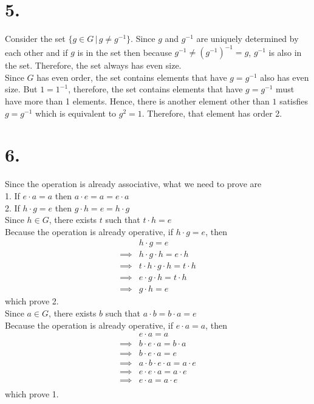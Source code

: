 \documentclass[11pt]{article}
\begin{document}
\pagebreak
\section*{5.}
Consider the set $\{g \in G \, | \, g \ne g^{-1}\}$. Since $g$ and $g^{-1}$ are uniquely determined by each other and if $g$ is in the set then because $g^{-1} \ne (g^{-1})^{-1} = g$, $g^{-1}$ is also in the set. Therefore, the set always has even size. \\
Since $G$ has even order, the set contains elements that have $g = g^{-1}$ also has even size. But $1 = 1^{-1}$, therefore, the set contains elements that have $g = g^{-1}$ must have more than 1 elements. Hence, there is another element other than $1$ satisfies $g= g^{-1}$ which is equivalent to $g^2 = 1$. Therefore, that element has order 2.














\pagebreak
\section*{6.}
Since the operation is already associative, what we need to prove are \\
1. If $e \cdot a = a$ then $a \cdot e = a = e \cdot a$ \\
2. If $h \cdot g = e$ then $g \cdot h = e = h \cdot g$\\
Since $h \in G$, there exists $t$ such that $t \cdot h = e$ \\
Because the operation is already operative, if $h \cdot g = e$, then 
\begin{equation*}
\begin{aligned}
&h \cdot g = e \\
\implies & h \cdot g \cdot h = e \cdot h \\
\implies & t \cdot h \cdot g \cdot h = t \cdot h \\
\implies & e \cdot g \cdot h  = t \cdot h \\
\implies & g \cdot h = e
\end{aligned}
\end{equation*}
which prove 2. \\
Since $a \in G$, there exists $b$ such that $a \cdot b = b \cdot a = e$ \\
Because the operation is already operative, if $e \cdot a = a$, then 
\begin{equation*}
\begin{aligned}
&e \cdot a = a \\
\implies & b \cdot e \cdot a = b \cdot a \\
\implies & b \cdot e \cdot a = e \\
\implies & a \cdot b \cdot e \cdot a  = a \cdot e \\
\implies & e \cdot e \cdot a  = a \cdot e \\
\implies & e \cdot a  = a \cdot e \\
\end{aligned}
\end{equation*}
which prove 1. \\
\end{document}
